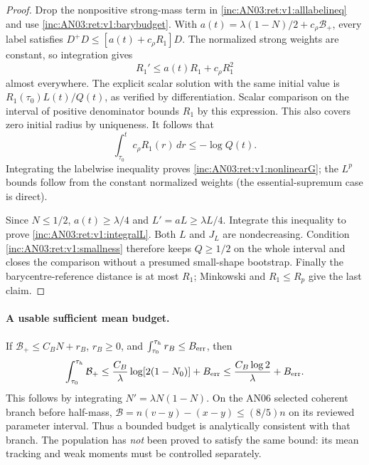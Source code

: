 \documentclass[11pt]{article}
\numberwithin{equation}{section}
\theoremstyle{remark}\newtheorem{remark}[theorem]{Remark}
\newcommand{\dd}{\,d}
\newcommand{\1}{\mathbf 1}
\begin{document}
\begin{proof}
Drop the nonpositive strong-mass term in
\eqref{inc:AN03:ret:v1:alllabelineq} and use
\eqref{inc:AN03:ret:v1:barybudget}. With
$a(t)=\lambda(1-N)/2+c_\rho\mathcal B_+$, every label satisfies
$D^+D\le[a(t)+c_\rho R_1]D$.
The normalized strong weights are constant, so integration gives
\[
 R_1'\le a(t)R_1+c_\rho R_1^2
\]
almost everywhere. The explicit scalar solution with the same initial
value is $R_1(\tau_0)L(t)/Q(t)$, as verified by differentiation.
Scalar comparison on the interval of positive denominator bounds $R_1$
by this expression. This also covers zero initial radius by uniqueness.
It follows that
\[
 \int_{\tau_0}^t c_\rho R_1(r)\dd r
 \le-\log Q(t).
\]
Integrating the labelwise inequality proves
\eqref{inc:AN03:ret:v1:nonlinearG}; the $L^p$ bounds follow from the
constant normalized weights (the essential-supremum case is direct).

Since $N\le1/2$, $a(t)\ge\lambda/4$ and $L'=aL\ge\lambda L/4$.
Integrate this inequality to prove \eqref{inc:AN03:ret:v1:integralL}.
Both $L$ and $J_L$ are nondecreasing. Condition
\eqref{inc:AN03:ret:v1:smallness} therefore keeps $Q\ge1/2$ on the
whole interval and closes the comparison without a presumed small-shape
bootstrap. Finally the barycentre-reference distance is at most $R_1$;
Minkowski and $R_1\le R_p$ give the last claim.
\end{proof}

\paragraph{A usable sufficient mean budget.}
If
$\mathcal B_+\le C_B N+r_B$, $r_B\ge0$, and
$\int_{\tau_0}^{\tau_h}r_B\le B_{\rm err}$, then
\begin{equation}\label{inc:AN03:ret:v1:meanbudget}
 \int_{\tau_0}^{\tau_h}\mathcal B_+
 \le\frac{C_B}{\lambda}\log[2(1-N_0)]+B_{\rm err}
 \le\frac{C_B\log2}{\lambda}+B_{\rm err}.
\end{equation}
This follows by integrating $N'=\lambda N(1-N)$.
On the AN06 selected coherent branch before half-mass,
$\mathcal B=n(v-y)-(x-y)\le(8/5)n$ on its reviewed parameter interval.
Thus a bounded budget is analytically consistent with that branch.
The population has \emph{not} been proved to satisfy the same bound:
its mean tracking and weak moments must be controlled separately.
\end{document}
